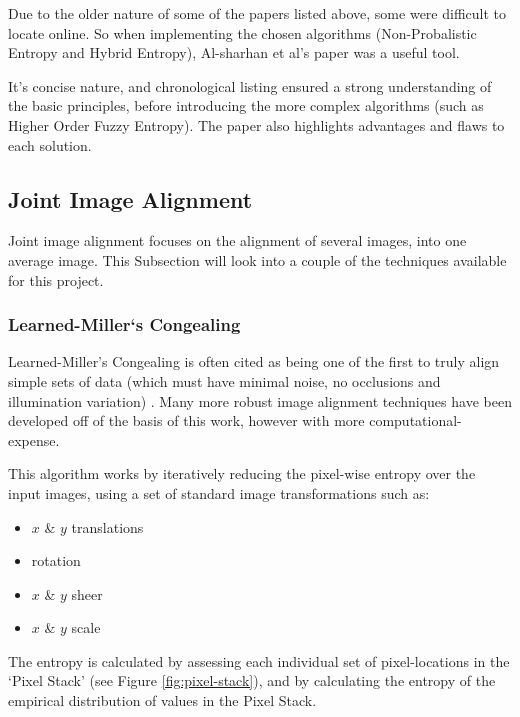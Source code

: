 Due to the older nature of some of the papers listed above, some were difficult to locate online. So when implementing the chosen algorithms (Non-Probalistic Entropy and Hybrid Entropy), Al-sharhan et al's paper  \cite{Al-Sharhan_Karray_Gueaieb_Basir_2001} was a useful tool.

It's concise nature, and chronological listing ensured a strong understanding of the basic principles, before introducing the more complex algorithms (such as Higher Order Fuzzy Entropy). The paper also highlights advantages and flaws to each solution.

\subsection{Joint Image Alignment}

Joint image alignment focuses on the alignment of several images, into one average image. This Subsection will look into a couple of the techniques available for this project.

\subsubsection{Learned-Miller`s Congealing}

Learned-Miller's \Gls{Congealing} \cite{joint-alignment} is often cited as being one of the first to truly align simple sets of data (which must have minimal noise, no occlusions and illumination variation) \cite{Zhou_Lee_Yu_Efros_2015} \cite{peng2012rasl} \cite{Peng_Ganesh_Wright_Xu_Ma_2012}. Many more robust image alignment techniques have been developed off of the basis of this work, however with more computational-expense.

This algorithm works by iteratively reducing the pixel-wise entropy over the input images, using a set of standard image transformations such as:

\begin{itemize}
  \item $x$ \& $y$ translations
  \item rotation
  \item $x$ \& $y$ sheer
  \item $x$ \& $y$ scale
\end{itemize}

The entropy is calculated by assessing each individual set of pixel-locations in the `Pixel Stack' (see Figure \ref{fig:pixel-stack}), and by calculating the entropy of the empirical distribution of values in the Pixel Stack.

